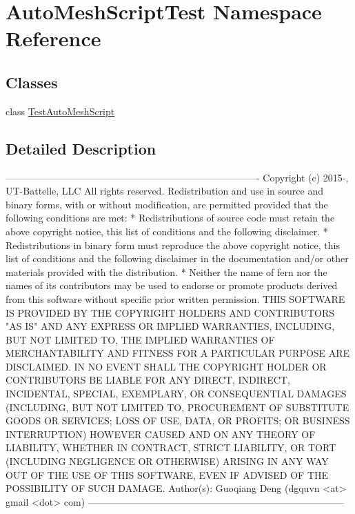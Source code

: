 \hypertarget{a00215}{}\section{Auto\+Mesh\+Script\+Test Namespace Reference}
\label{a00215}
\subsection*{Classes}
\begin{DoxyCompactItemize}
\item 
class \hyperlink{a00813}{Test\+Auto\+Mesh\+Script}
\end{DoxyCompactItemize}


\subsection{Detailed Description}
\begin{DoxyVerb}-------------------------------------------------------------------------------
 Copyright (c) 2015-, UT-Battelle, LLC
 All rights reserved.
 Redistribution and use in source and binary forms, with or without
 modification, are permitted provided that the following conditions are met:
 * Redistributions of source code must retain the above copyright notice, this
 list of conditions and the following disclaimer.
 * Redistributions in binary form must reproduce the above copyright notice,
 this list of conditions and the following disclaimer in the documentation
 and/or other materials provided with the distribution.
 * Neither the name of fern nor the names of its
 contributors may be used to endorse or promote products derived from
 this software without specific prior written permission.
 THIS SOFTWARE IS PROVIDED BY THE COPYRIGHT HOLDERS AND CONTRIBUTORS "AS IS"
 AND ANY EXPRESS OR IMPLIED WARRANTIES, INCLUDING, BUT NOT LIMITED TO, THE
 IMPLIED WARRANTIES OF MERCHANTABILITY AND FITNESS FOR A PARTICULAR PURPOSE ARE
 DISCLAIMED. IN NO EVENT SHALL THE COPYRIGHT HOLDER OR CONTRIBUTORS BE LIABLE
 FOR ANY DIRECT, INDIRECT, INCIDENTAL, SPECIAL, EXEMPLARY, OR CONSEQUENTIAL
 DAMAGES (INCLUDING, BUT NOT LIMITED TO, PROCUREMENT OF SUBSTITUTE GOODS OR
 SERVICES; LOSS OF USE, DATA, OR PROFITS; OR BUSINESS INTERRUPTION) HOWEVER
 CAUSED AND ON ANY THEORY OF LIABILITY, WHETHER IN CONTRACT, STRICT LIABILITY,
 OR TORT (INCLUDING NEGLIGENCE OR OTHERWISE) ARISING IN ANY WAY OUT OF THE USE
 OF THIS SOFTWARE, EVEN IF ADVISED OF THE POSSIBILITY OF SUCH DAMAGE.
 Author(s): Guoqiang Deng (dgquvn <at> gmail <dot> com)
 --------------------------------------------------------------------------------\end{DoxyVerb}
 